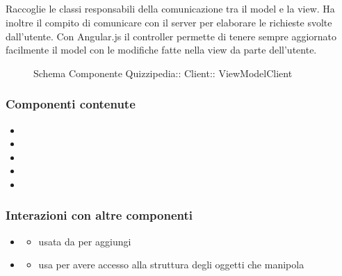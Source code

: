 \subsection{}
Raccoglie le classi responsabili della comunicazione tra il model e la view. Ha inoltre il compito di comunicare con il server per elaborare le richieste svolte dall'utente.
Con Angular.js il controller permette di tenere sempre aggiornato facilmente il model con le modifiche fatte nella view da parte dell'utente.
\begin{figure}[H]
\centering
\noindent{}
\caption[Schema Componente ViewModelClient]{Schema Componente Quizzipedia:: Client:: ViewModelClient}
\end{figure}
\subsubsection{Componenti contenute}
\begin{itemize}
\item {}
\item {}
\item {}
\item {}
\item {}
\end{itemize}
\subsubsection{Interazioni con altre componenti}
\begin{itemize}
\item {}
\begin{itemize}
\item usata da  per aggiungi
\end{itemize}
\item {}
\begin{itemize}
\item usa  per avere accesso alla struttura degli oggetti che manipola
\end{itemize}
\end{itemize}
